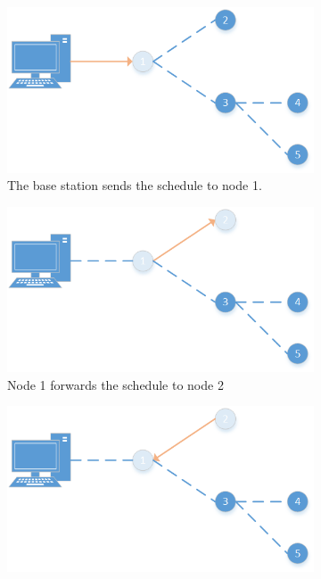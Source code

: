 \begin{figure}[htbp]
	\centering
	\begin{subfigure}[t]{0.4\textwidth}
		\centering
    		\includegraphics[scale=0.6]{content/images/ScheduleSpreading/Part1}
   	 	\caption{The base station sends the schedule to node 1.}
    	\label{fig:density}
    \end{subfigure}
    \quad
    \quad
    \begin{subfigure}[t]{0.4\textwidth}
		\centering         
        \includegraphics[scale=0.6]{content/images/ScheduleSpreading/Part2}
        \caption{Node 1 forwards the schedule to node 2}
        \label{fig:link}
    \end{subfigure}
    \quad
    \quad
    \begin{subfigure}[t]{0.4\textwidth}
		\centering         
        \includegraphics[scale=0.6]{content/images/ScheduleSpreading/Part3}

\end{subfigure}
\end{figure}
